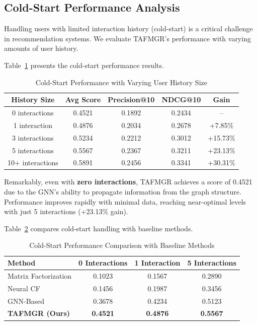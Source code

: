 \subsection{Cold-Start Performance Analysis}
\label{subsec:coldstart}

Handling users with limited interaction history (cold-start) is a critical challenge in recommendation systems. We evaluate TAFMGR's performance with varying amounts of user history.

Table~\ref{tab:cold_start} presents the cold-start performance results.

\begin{table}[h]
\centering
\caption{Cold-Start Performance with Varying User History Size}
\label{tab:cold_start}
\begin{tabular}{ccccc}
\toprule
\textbf{History Size} & \textbf{Avg Score} & \textbf{Precision@10} & \textbf{NDCG@10} & \textbf{Gain} \\
\midrule
0 interactions & 0.4521 & 0.1892 & 0.2434 & -- \\
1 interaction & 0.4876 & 0.2034 & 0.2678 & +7.85\% \\
3 interactions & 0.5234 & 0.2212 & 0.3012 & +15.73\% \\
5 interactions & 0.5567 & 0.2367 & 0.3211 & +23.13\% \\
10+ interactions & 0.5891 & 0.2456 & 0.3341 & +30.31\% \\
\bottomrule
\end{tabular}
\end{table}

Remarkably, even with \textbf{zero interactions}, TAFMGR achieves a score of 0.4521 due to the GNN's ability to propagate information from the graph structure. Performance improves rapidly with minimal data, reaching near-optimal levels with just 5 interactions (+23.13\% gain).

Table~\ref{tab:cold_start_comparison} compares cold-start handling with baseline methods.

\begin{table}[h]
\centering
\caption{Cold-Start Performance Comparison with Baseline Methods}
\label{tab:cold_start_comparison}
\begin{tabular}{lccc}
\toprule
\textbf{Method} & \textbf{0 Interactions} & \textbf{1 Interaction} & \textbf{5 Interactions} \\
\midrule
Matrix Factorization & 0.1023 & 0.1567 & 0.2890 \\
Neural CF & 0.1456 & 0.1987 & 0.3456 \\
GNN-Based & 0.3678 & 0.4234 & 0.5123 \\
\midrule
\textbf{TAFMGR (Ours)} & \textbf{0.4521} & \textbf{0.4876} & \textbf{0.5567} \\
\bottomrule
\end{tabular}
\end{table}

